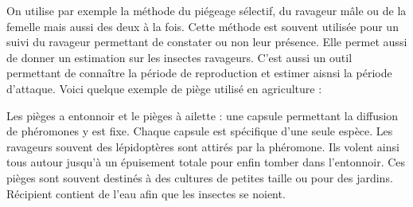 On utilise par exemple la méthode du piégeage sélectif, du ravageur mâle
ou de la femelle mais aussi des deux à la fois. Cette méthode est
souvent utilisée pour un suivi du ravageur permettant de constater ou
non leur présence. Elle permet aussi de donner un estimation sur les
insectes ravageurs. C'est aussi un outil permettant de connaître la
période de reproduction et estimer aisnsi la période d'attaque. Voici
quelque exemple de piège utilisé en agriculture :

Les pièges a entonnoir et le pièges à ailette : une capsule permettant
la diffusion de phéromones y est fixe. Chaque capsule est spécifique
d'une seule espèce. Les ravageurs souvent des lépidoptères sont attirés
par la phéromone. Ils volent ainsi tous autour jusqu'à un épuisement
totale pour enfin tomber dans l'entonnoir. Ces pièges sont souvent
destinés à des cultures de petites taille ou pour des jardins. Récipient
contient de l'eau afin que les insectes se noient.